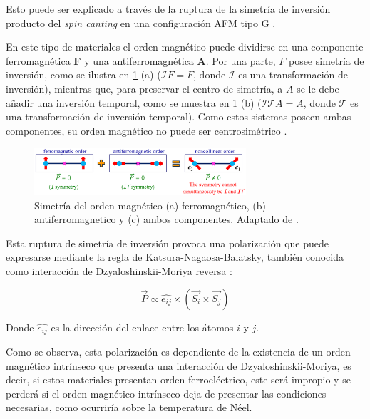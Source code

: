 \documentclass[../main.tex]{subfiles}
\begin{document}
Esto puede ser explicado a través de la ruptura de la simetría de inversión producto del \textit{spin canting} en una configuración AFM tipo G \cite{Lee2011}.

En este tipo de materiales el orden magnético puede dividirse en una componente ferromagnética $\pmb{F}$ y una antiferromagnética $\pmb{A}$. Por una parte, $F$ posee simetría de inversión, como se ilustra en \ref{fig:spincantingferroelec} (a) ($\mathcal{I}F=F$, donde $\mathcal{I}$ es una transformación de inversión), mientras que, para preservar el centro de simetría, a $A$ se le debe añadir una inversión temporal, como se muestra en \ref{fig:spincantingferroelec} (b) ($\mathcal{I}\mathcal{T}A=A$, donde $\mathcal{T}$ es una transformación de inversión temporal). Como estos sistemas poseen ambas componentes, su orden magnético no puede ser centrosimétrico \cite{Solovyev2025}.

\begin{figure}
    \includegraphics[width=0.7\textwidth]{fig/spincantingferroelec.png}
    \caption{Simetría del orden magnético (a) ferromagnético, (b) antiferromagnetico y (c) ambos componentes. Adaptado de \cite{Solovyev2025}.}
    \label{fig:spincantingferroelec}
\end{figure}

Esta ruptura de simetría de inversión provoca una polarización que puede expresarse mediante la regla de Katsura-Nagaosa-Balatsky, también conocida como interacción de Dzyaloshinskii-Moriya reversa \cite{Katsura2005}:

\begin{equation}
    \vec{P}\propto\hat{e_{ij}}\times\left(\vec{S_i}\times\vec{S_j}\right)
\end{equation}

Donde $\hat{e_{ij}}$ es la dirección del enlace entre los átomos $i$ y $j$.

Como se observa, esta polarización es dependiente de la existencia de un orden magnético intrínseco que presenta una interacción de Dzyaloshinskii-Moriya, es decir, si estos materiales presentan orden ferroeléctrico, este será impropio y se perderá si el orden magnético intrínseco deja de presentar las condiciones necesarias, como ocurriría sobre la temperatura de Néel.
\end{document}
